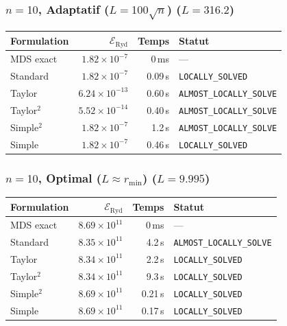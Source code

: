 \subsubsection{$n=10$, Adaptatif ($L{=}100\sqrt{n}$) ($L=316.2$)}
\begin{longtable}{@{}lrrl@{}}
  \toprule
  Formulation & $\mathcal{E}_{\mathrm{Ryd}}$ & Temps & Statut \\
  \midrule
  \endhead
  MDS exact & $1.82\times10^{-7}$ & 0\,ms & --- \\
  Standard & $1.82\times10^{-7}$ & 0.09\,s & \texttt{LOCALLY\_SOLVED} \\
  Taylor & $6.24\times10^{-13}$ & 0.60\,s & \texttt{ALMOST\_LOCALLY\_SOLVE} \\
  Taylor$^2$ & $5.52\times10^{-14}$ & 0.40\,s & \texttt{ALMOST\_LOCALLY\_SOLVE} \\
  Simple$^2$ & $1.82\times10^{-7}$ & 1.2\,s & \texttt{ALMOST\_LOCALLY\_SOLVE} \\
  Simple & $1.82\times10^{-7}$ & 0.46\,s & \texttt{LOCALLY\_SOLVED} \\
  \bottomrule
\end{longtable}

\subsubsection{$n=10$, Optimal ($L{\approx}r_{\min}$) ($L=9.995$)}
\begin{longtable}{@{}lrrl@{}}
  \toprule
  Formulation & $\mathcal{E}_{\mathrm{Ryd}}$ & Temps & Statut \\
  \midrule
  \endhead
  MDS exact & $8.69\times10^{11}$ & 0\,ms & --- \\
  Standard & $8.35\times10^{11}$ & 4.2\,s & \texttt{ALMOST\_LOCALLY\_SOLVE} \\
  Taylor & $8.34\times10^{11}$ & 2.2\,s & \texttt{LOCALLY\_SOLVED} \\
  Taylor$^2$ & $8.34\times10^{11}$ & 9.3\,s & \texttt{LOCALLY\_SOLVED} \\
  Simple$^2$ & $8.69\times10^{11}$ & 0.21\,s & \texttt{LOCALLY\_SOLVED} \\
  Simple & $8.69\times10^{11}$ & 0.17\,s & \texttt{LOCALLY\_SOLVED} \\
  \bottomrule
\end{longtable}

